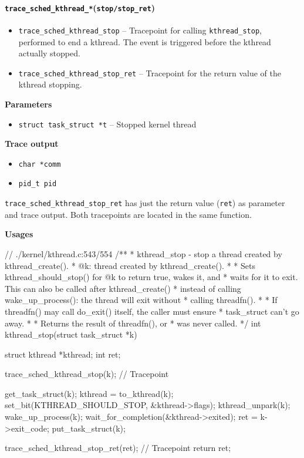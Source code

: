 \paragraph{\texttt{trace\_sched\_kthread\_*}(\texttt{stop/stop\_ret})}
\begin{itemize}
    \item \texttt{trace\_sched\_kthread\_stop} -- Tracepoint for calling \verb|kthread_stop|, performed to end a kthread. The event is triggered before the kthread actually stopped.
    \item \texttt{trace\_sched\_kthread\_stop\_ret} -- Tracepoint for the return value of the kthread stopping.
\end{itemize}

\textbf{Parameters}
\begin{itemize}
    \item \verb|struct task_struct *t| -- Stopped kernel thread
\end{itemize}

\textbf{Trace output}
\begin{itemize}
    \item \verb|char *comm|
    \item \verb|pid_t pid|
\end{itemize}

\texttt{trace\_sched\_kthread\_stop\_ret} has just the return value (\verb|ret|) as parameter and trace output. Both tracepoints are located in the same function.

\textbf{Usages}
\begin{code}
// ./kernel/kthread.c:543/554
/**
 * kthread_stop - stop a thread created by kthread_create().
 * @k: thread created by kthread_create().
 *
 * Sets kthread_should_stop() for @k to return true, wakes it, and
 * waits for it to exit. This can also be called after kthread_create()
 * instead of calling wake_up_process(): the thread will exit without
 * calling threadfn().
 *
 * If threadfn() may call do_exit() itself, the caller must ensure
 * task_struct can't go away.
 *
 * Returns the result of threadfn(), or %
 * was never called.
 */
int kthread_stop(struct task_struct *k){
	struct kthread *kthread;
	int ret;

	trace_sched_kthread_stop(k); // Tracepoint

	get_task_struct(k);
	kthread = to_kthread(k);
	set_bit(KTHREAD_SHOULD_STOP, &kthread->flags);
	kthread_unpark(k);
	wake_up_process(k);
	wait_for_completion(&kthread->exited);
	ret = k->exit_code;
	put_task_struct(k);

	trace_sched_kthread_stop_ret(ret); // Tracepoint
	return ret;
}
\end{code}